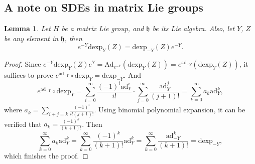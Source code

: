 \documentclass[10pt]{article}
\newtheorem{lemma}{Lemma}
\begin{document}
\subsection{A note on SDEs in matrix Lie groups}

\begin{lemma} \label{lemma:expCommuteDexp}
	Let $H$ be a matrix Lie group, and $\mathfrak{h}$ be its Lie algebra.
	Also, let $Y$, $Z$ be any element in $\mathfrak{h}$, then
	\begin{equation}
		e^{-Y}\mathrm{dexp}_{Y}(Z) = \mathrm{dexp}_{-Y}(Z)e^{-Y}.
	\end{equation}
\end{lemma}
\begin{proof}
	Since $e^{-Y}\mathrm{dexp}_Y(Z)e^Y = \mathrm{Ad}_{e^{-Y}}(\mathrm{dexp}_Y(Z)) = e^{\mathrm{ad}_{-Y}}(\mathrm{dexp}_Y(Z))$, it suffices to prove $e^{\mathrm{ad}_{-Y}}\circ\mathrm{dexp}_Y = \mathrm{dexp}_{-Y}$.
	And
	\begin{equation}
		e^{\mathrm{ad}_{-Y}}\circ\mathrm{dexp}_Y = \sum_{i=0}^\infty\frac{(-1)^i\mathrm{ad}^i_Y}{i!} \cdot \sum_{j=0}^\infty\frac{\mathrm{ad}_Y^j}{(j+1)!} = \sum_{k=0}^\infty a_k\mathrm{ad}_Y^k,
	\end{equation}
	where $a_k = \sum_{i+j=k}\frac{(-1)^i}{i!(j+1)!}$.
	Using binomial polynomial expansion, it can be verified that $a_k=\frac{(-1)^k}{(k+1)!}$.
	Then 
	\begin{equation}
		\sum_{k=0}^\infty a_k\mathrm{ad}_Y^k = \sum_{k=0}^\infty\frac{(-1)^k}{(k+1)!}\mathrm{ad}_Y^k = \sum_{k=0}^\infty\frac{\mathrm{ad}_{-Y}^k}{(k+1)!} = \mathrm{dexp}_{-Y},
	\end{equation}
	which finishes the proof.
\end{proof}
\end{document}
